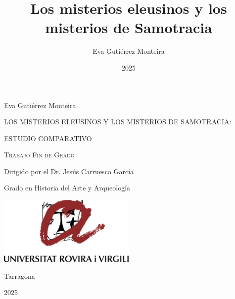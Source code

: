 \documentclass[a4paper,12pt]{book}
\begin{document}
\author{Eva Gutiérrez Monteira}
\title{Los misterios eleusinos y los misterios de Samotracia}
\date{2025}
\renewcommand{\chaptername}{}

\frontmatter

\begin{titlepage}
	\centering
	{\Large Eva Gutiérrez Monteira \par}
	\vspace{1cm}
	{\scshape\large LOS MISTERIOS ELEUSINOS Y LOS MISTERIOS DE SAMOTRACIA: \par}
	{\scshape\large ESTUDIO COMPARATIVO \par}
	\vspace{2cm}
	{\scshape\Large Trabajo Fin de Grado \par}
	\vfill
	{\large Dirigido por el Dr. Jesús Carruesco García \par}
	{\large Grado en Historia del Arte y Arqueología \par}
	\vspace{2cm}
	{\includegraphics[width=0.5\textwidth]{logo}\par}
	\vfill	
	{\small Tarragona \par}	
	{\small 2025 \par}
	\vfill	
	\end{titlepage}


\tableofcontents{}
\end{document}
